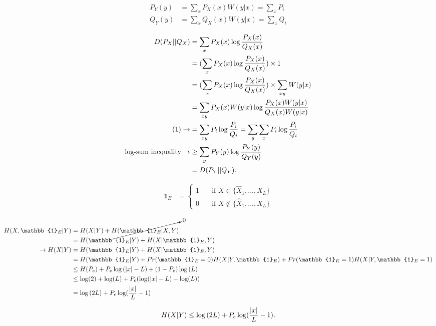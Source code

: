 \documentclass[
  course = {{EE623 Information Theory}},
  quartile = {{3}},
  assignment = 2,
  name = {{Mohammad Mahdi Rahimi}},
  studentnumber = {{20208244}},
  email = {{mahi@kaist.ac.kr}},
  firstexercise = 1
]{aga-homework}
\begin{document}
\exercise

\begin{equation} \label{eq1}
\begin{split}
P_Y(y) & = \sum_x{P_X(x)W(y|x)} = \sum_x{P_i}\\
Q_Y(y) & = \sum_x{Q_X(x)W(y|x)} = \sum_x{Q_i}
\end{split}
\end{equation}

\begin{equation} \label{eq2}
\begin{split}
D(P_X || Q_X) & = \sum_x{P_X(x)\log{P_X(x) \over Q_X(x)}} \\
& = (\sum_x{P_X(x)\log{P_X(x) \over Q_X(x)}}) \times 1 \\
& = (\sum_x{P_X(x)\log{P_X(x) \over Q_X(x)}}) \times \sum_{xy}{W(y|x)} \\
& = \sum_{xy}{P_X(x)W(y|x)\log{P_X(x)W(y|x) \over Q_X(x) W(y|x)}} \\
(1) \rightarrow & = \sum_{xy}P_i\log{P_i \over Q_i}  = \sum_y\sum_{x}P_i\log{P_i \over Q_i}\\
\text{log-sum inequality} \rightarrow & \ge \sum_y{P_Y(y)\log{P_Y(y) \over Q_Y(y)}} \\
& = D(P_Y || Q_Y). 
\end{split}
\end{equation}

\exercise

\begin{equation} \label{eq3}
\begin{split}
\mathbb{1}_E & = 
\begin{cases}
    1 &\quad\text{if } X \in \{\hat{X}_1 , ..., \hat{X}_L\}\\
    0 &\quad\text{if } X \notin \{\hat{X}_1 , ..., \hat{X}_L\}
\end{cases}
\end{split}
\end{equation}

\begin{equation} \label{eq4}
\begin{split}
H(X,\mathbb{1}_E|Y) & = H(X|Y) + \cancelto{0}{H(\mathbb{1}_E | X,Y)} \\
& = H(\mathbb{1}_E | Y) + H(X | \mathbb{1}_E, Y) \\
\rightarrow H(X|Y) & = H(\mathbb{1}_E | Y) + H(X | \mathbb{1}_E, Y)\\
& = H(\mathbb{1}_E | Y) + Pr(\mathbb{1}_E = 0)H(X|Y, \mathbb{1}_E) + Pr(\mathbb{1}_E = 1)H(X|Y, \mathbb{1}_E = 1)\\
& \le H(P_e) + P_e \log{(|x| - L)} + (1 - P_e) \log{(L)} \\
& \le \log(2) + \log(L) + P_e(\log(|x| - L) - \log(L)) \\
& = \log{(2L)} + P_e\log({|x| \over L} - 1)
\end{split}
\end{equation}

\begin{equation} \label{eq5}
\begin{split}
H(X|Y) \le \log{(2L)} + P_e\log({|x| \over L} - 1).
\end{split}
\end{equation}
\end{document}
